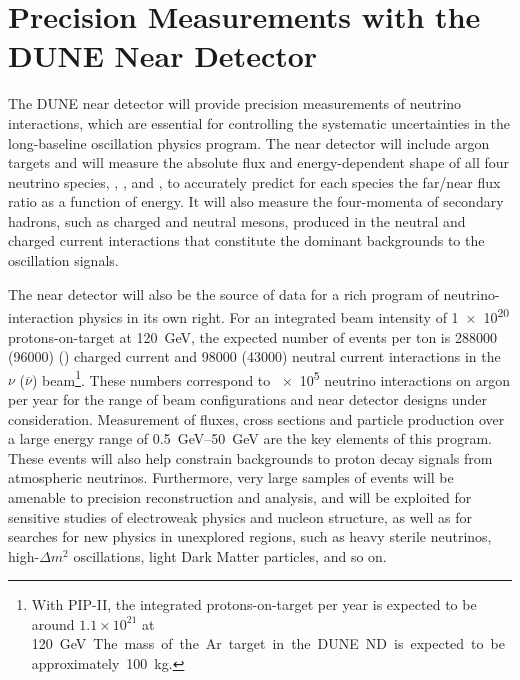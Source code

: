 %
%
\section{Precision Measurements with the DUNE Near Detector}

The DUNE near detector
will provide precision measurements of
neutrino interactions, which are essential
for controlling the systematic uncertainties in the long-baseline
oscillation physics program.  The near detector %
will include argon targets and will measure the absolute flux and energy-dependent
shape of all four neutrino species, \numu, \anumu, \nue and \anue,
to accurately predict for each species the
far/near flux ratio as a function of energy.  It will also measure the
four-momenta of secondary hadrons, such as charged and neutral mesons,
produced in the neutral and charged current interactions that
constitute the dominant backgrounds to the oscillation signals.

The near detector will also be the source of data for a rich program
of neutrino-interaction physics in its own right. For an integrated
beam intensity of \num{1e20} %
protons-on-target at \SI{120}{GeV}, the expected number of events per
ton is \num{288000} (\num{96000}) %
\numu (\anumu) charged current and \num{98000} (\num{43000}) neutral
current interactions in the $\nu$ ($\overline\nu$) beam\footnote{With PIP-II, the integrated protons-on-target per year is
  expected to be around $1.1\times 10^{21}$ at \SI{120}\GeV. The mass
  of the Ar target in the DUNE ND is expected to be approximately
  100~kg.}. 
  These numbers correspond to \num{e5} neutrino interactions
on argon per year for the range of beam configurations and near detector
designs under consideration.  Measurement of fluxes, cross sections
and particle production over a large energy range of
\SIrange{0.5}{50}{\GeV} are the key elements of this program.  These
events will also help constrain backgrounds to proton decay signals
from atmospheric neutrinos.  Furthermore, very large samples of events
will be amenable to precision reconstruction and analysis, and will be
exploited for sensitive studies of electroweak physics and nucleon
structure, as well as for searches for new physics in unexplored
regions, such as heavy sterile neutrinos, high-$\Delta m^2$
oscillations, light Dark Matter particles, and so on.


